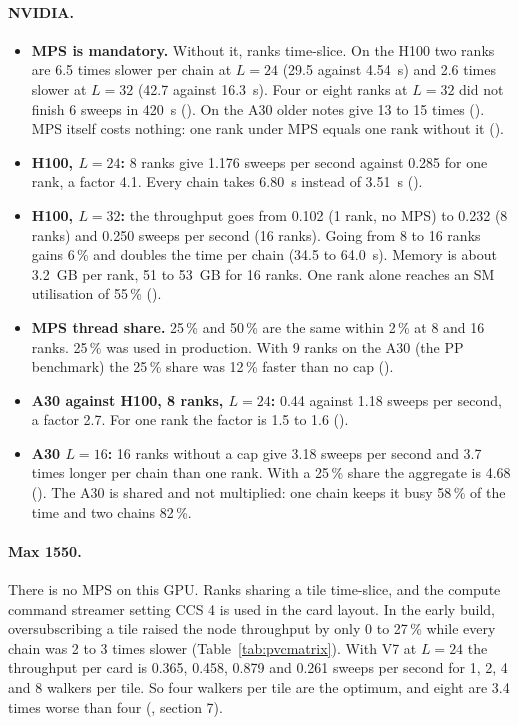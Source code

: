 \paragraph{NVIDIA.}
\begin{itemize}
\item \textbf{MPS is mandatory.} Without it, ranks time-slice. On the H100 two ranks are 6.5 times slower per chain at $L=24$ (29.5 against 4.54~s) and 2.6 times slower at $L=32$ (42.7 against 16.3~s). Four or eight ranks at $L=32$ did not finish 6 sweeps in 420~s (). On the A30 older notes give 13 to 15 times (). MPS itself costs nothing: one rank under MPS equals one rank without it ().
\item \textbf{H100, $L=24$:} 8 ranks give 1.176 sweeps per second against 0.285 for one rank, a factor 4.1. Every chain takes 6.80~s instead of 3.51~s ().
\item \textbf{H100, $L=32$:} the throughput goes from 0.102 (1 rank, no MPS) to 0.232 (8 ranks) and 0.250 sweeps per second (16 ranks). Going from 8 to 16 ranks gains 6\,\% and doubles the time per chain (34.5 to 64.0~s). Memory is about 3.2~GB per rank, 51 to 53~GB for 16 ranks. One rank alone reaches an SM utilisation of 55\,\% ().
\item \textbf{MPS thread share.} 25\,\% and 50\,\% are the same within 2\,\% at 8 and 16 ranks. 25\,\% was used in production. With 9 ranks on the A30 (the PP benchmark) the 25\,\% share was 12\,\% faster than no cap ().
\item \textbf{A30 against H100, 8 ranks, $L=24$:} 0.44 against 1.18 sweeps per second, a factor 2.7. For one rank the factor is 1.5 to 1.6 ().
\item \textbf{A30 $L=16$:} 16 ranks without a cap give 3.18 sweeps per second and 3.7 times longer per chain than one rank. With a 25\,\% share the aggregate is 4.68 (). The A30 is shared and not multiplied: one chain keeps it busy 58\,\% of the time and two chains 82\,\%.
\end{itemize}

\paragraph{Max 1550.} There is no MPS on this GPU. Ranks sharing a tile time-slice, and the compute command streamer setting CCS 4 is used in the card layout. In the early build, oversubscribing a tile raised the node throughput by only 0 to 27\,\% while every chain was 2 to 3 times slower (Table~\ref{tab:pvcmatrix}). With V7 at $L=24$ the throughput per card is 0.365, 0.458, 0.879 and 0.261 sweeps per second for 1, 2, 4 and 8 walkers per tile. So four walkers per tile are the optimum, and eight are 3.4 times worse than four (, section 7). 

